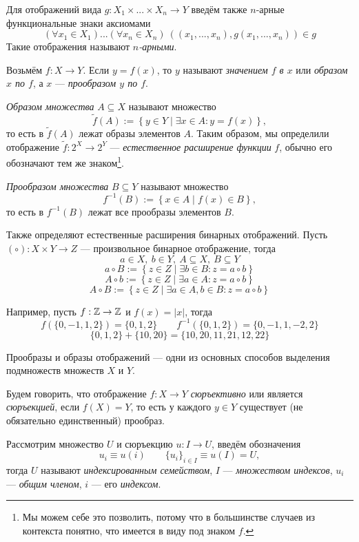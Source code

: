 Для отображений вида $g:X_1\times ...\times X_{n}\to Y$
введём также $n$-арные функциональные знаки аксиомами
\[
	(\forall x_1\in X_1)...(\forall x_{n}\in X_{n})~
	((x_1,...,x_{n}), g(x_1,...,x_{n}))\in g
\]
Такие отображения называют {\it $n$-арными}.

Возьмём ${f:X\to Y}$. Если ${y=f(x)}$, то $y$ называют {\it значением $f$ в $x$}
 или {\it образом $x$ по $f$},
а $x$ --- {\it прообразом $y$ по $f$}.

{\it Образом множества} $A\subseteq X$
называют множество
\[
	\widetilde f(A):=\left\{y\in Y\;\big|\; \exists x\in A:y=f(x)\right\},
\]
то есть в $\widetilde f(A)$ лежат образы элементов $A$. Таким образом, мы определили
отображение $\widetilde f:2^{X}\to 2^{Y}$ ---
{\it естественное расширение функции}
$f$, обычно его обозначают
тем же знаком\footnote{Мы можем себе это позволить, потому что
	в большинстве случаев из контекста понятно, что имеется
	в виду под знаком $f$.}.

{\it Прообразом множества}
$B\subseteq Y$ называют множество
\[
	f^{-1}(B):=\left\{x\in A\;\big|\; f(x)\in B\right\},
\]
то есть в $f^{-1}(B)$ лежат все прообразы элементов $B$.

Также определяют естественные расширения бинарных отображений.
Пусть $(\circ):X\times Y\to Z$ --- произвольное бинарное отображение, тогда
\[
	a\in X,~ b\in Y,~A\subseteq X,~ B\subseteq Y
\]
\[
	a\circ B:=\left\{z\in Z\;\big|\;\exists b\in B:z=a\circ b\right\}
\]
\[
	A\circ b:=\left\{z\in Z\;\big|\;\exists a\in A:z=a\circ b\right\}
\]
\[
	A\circ B:=\left\{z\in Z\;\big|\;\exists a\in A,b\in B:z=a\circ b\right\}
\]

Например, пусть $f:\mathbb Z\to\mathbb Z$ и $f(x)=|x|$, тогда
\[
	f(\{0,-1,1,2\})=\{0,1,2\}\qquad f^{-1}(\{0,1,2\})=\{0,-1,1,-2,2\}
\]
\[
	\{0,1,2\}+\{10,20\}=\{10,20,11,21,12,22\}
\]

Прообразы и образы отображений --- одни из основных способов выделения
подмножеств множеств $X$ и $Y$.

Будем говорить, что отображение $f:X\to Y$ {\it сюръективно}
или является {\it сюръекцией}, если $f(X)=Y$,
то есть у каждого $y\in Y$ существует (не обязательно единственный) прообраз.

Рассмотрим множество $U$ и сюръекцию ${u:I\to U}$,
введём обозначения
\[
	u_{i}\equiv u(i)\qquad \{u_{i}\}_{i\in I}\equiv u(I)=U,
\]
тогда $U$ называют {\it индексированным семейством},
$I$ --- {\it множеством индексов},
$u_{i}$ --- {\it общим членом},
$i$ --- его {\it индексом}.

